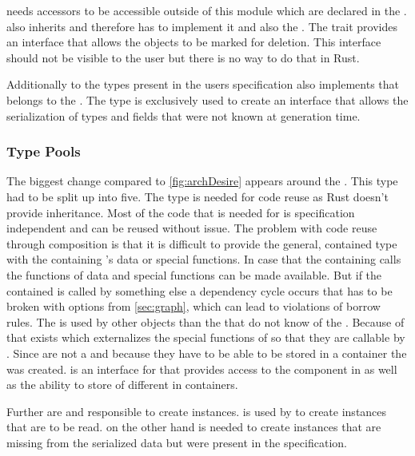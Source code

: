 \documentclass[thesis]{subfiles}
\begin{document}
      \age needs accessors to be accessible outside of this module which are declared in the \AgeObject \trait.
      \AgeObject also inherits \SkillObject and therefore has to implement it and also the \Deleteable \trait.
      The \Deleteable trait provides an interface that allows the objects to be marked for deletion.
      This interface should not be visible to the user but there is no way to do that in Rust.

      Additionally to the types present in the users specification \Age also implements \ForeignObject that belongs to the \Foreign \struct.
      The \Foreign type is exclusively used to create an interface that allows the serialization of types and fields that were not known at generation time.


    \subsubsection{Type Pools}
      The biggest change compared to \autoref{fig:archDesire} appears around the \UserTypePool.
      This type had to be split up into five.
      The \Pool type is needed for code reuse as Rust doesn't provide inheritance.
      Most of the code that is needed for \UserTypePools is specification independent and can be reused without issue.
      The problem with code reuse through composition is that it is difficult to provide the general, contained type with the containing \struct's data or special functions.
      In case that the containing \struct calls the functions of \Pool data and special functions can be made available.
      But if the contained \struct is called by something else a dependency cycle occurs that has to be broken with options from \autoref{sec:graph}, which can lead to violations of borrow rules.
      The \Pool is used by other objects than the \UserTypePools that do not know of the \UserTypePools.
      Because of that \UserPartsMaker exists which externalizes the special functions of \UserTypePool so that they are callable by \Pool.
      Since \UserTypePools are not a \Pool and because they have to be able to be stored in a container the \PoolProxy \trait was created.
      \PoolProxy is an interface for \UserTypePools that provides access to the \Pool component in \UserTypePools as well as the ability to store \UserTypePools of different \UserTypes in containers.

      Further are \PoolProxy and \PartsMaker responsible to create \UserFieldDeclaration instances.
      \PartsMaker is used by \Pool to create \UserFieldDeclaration instances that are to be read.
      \PoolProxy on the other hand is needed to create \UserFieldDeclaration instances that are missing from the serialized data but were present in the specification.
\end{document}
